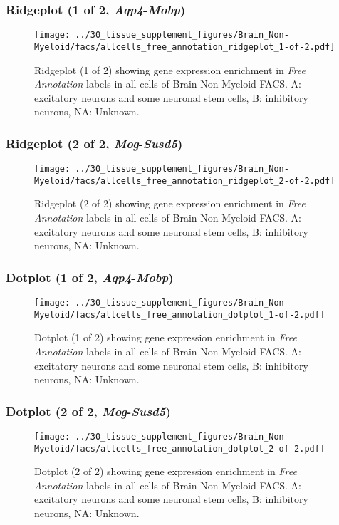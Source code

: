 \clearpage

\subsubsection{Ridgeplot (1 of 2, \emph{Aqp4}-\emph{Mobp})}
\begin{figure}[h]
\centering
\texttt{[image: ../30\_tissue\_supplement\_figures/Brain\_Non-Myeloid/facs/allcells\_free\_annotation\_ridgeplot\_1-of-2.pdf]}

\caption{ Ridgeplot (1 of 2)  showing gene expression enrichment in \emph{Free Annotation} labels in all cells of Brain Non-Myeloid FACS. A: excitatory neurons and some neuronal stem cells, B: inhibitory neurons, NA: Unknown.}
\end{figure}


\clearpage

\subsubsection{Ridgeplot (2 of 2, \emph{Mog}-\emph{Susd5})}
\begin{figure}[h]
\centering
\texttt{[image: ../30\_tissue\_supplement\_figures/Brain\_Non-Myeloid/facs/allcells\_free\_annotation\_ridgeplot\_2-of-2.pdf]}

\caption{ Ridgeplot (2 of 2)  showing gene expression enrichment in \emph{Free Annotation} labels in all cells of Brain Non-Myeloid FACS. A: excitatory neurons and some neuronal stem cells, B: inhibitory neurons, NA: Unknown.}
\end{figure}


\clearpage

\subsubsection{Dotplot (1 of 2, \emph{Aqp4}-\emph{Mobp})}
\begin{figure}[h]
\centering
\texttt{[image: ../30\_tissue\_supplement\_figures/Brain\_Non-Myeloid/facs/allcells\_free\_annotation\_dotplot\_1-of-2.pdf]}

\caption{ Dotplot (1 of 2)  showing gene expression enrichment in \emph{Free Annotation} labels in all cells of Brain Non-Myeloid FACS. A: excitatory neurons and some neuronal stem cells, B: inhibitory neurons, NA: Unknown.}
\end{figure}


\clearpage

\subsubsection{Dotplot (2 of 2, \emph{Mog}-\emph{Susd5})}
\begin{figure}[h]
\centering
\texttt{[image: ../30\_tissue\_supplement\_figures/Brain\_Non-Myeloid/facs/allcells\_free\_annotation\_dotplot\_2-of-2.pdf]}

\caption{ Dotplot (2 of 2)  showing gene expression enrichment in \emph{Free Annotation} labels in all cells of Brain Non-Myeloid FACS. A: excitatory neurons and some neuronal stem cells, B: inhibitory neurons, NA: Unknown.}
\end{figure}


